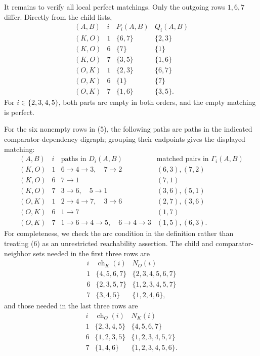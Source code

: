 It remains to verify all local perfect matchings.  Only the outgoing rows \(1,6,7\) differ.  Directly from the child lists,
\[
\begin{array}{c|c|c|c}
(A,B)&i&P_i(A,B)&Q_i(A,B)\\ \hline
(K,O)&1&\{6,7\}&\{2,3\}\\
(K,O)&6&\{7\}&\{1\}\\
(K,O)&7&\{3,5\}&\{1,6\}\\
(O,K)&1&\{2,3\}&\{6,7\}\\
(O,K)&6&\{1\}&\{7\}\\
(O,K)&7&\{1,6\}&\{3,5\}.
\end{array}
\tag{5}
\]
For \(i\in\{2,3,4,5\}\), both parts are empty in both orders, and the empty matching is perfect.

For the six nonempty rows in (5), the following paths are paths in the indicated comparator-dependency digraph; grouping their endpoints gives the displayed matching:
\[
\begin{array}{c|c|c|c}
(A,B)&i&\text{paths in }D_i(A,B)&\text{matched pairs in }\Gamma_i(A,B)\\ \hline
(K,O)&1&6\to4\to3,\quad 7\to2&(6,3),(7,2)\\
(K,O)&6&7\to1&(7,1)\\
(K,O)&7&3\to6,\quad 5\to1&(3,6),(5,1)\\
(O,K)&1&2\to4\to7,\quad 3\to6&(2,7),(3,6)\\
(O,K)&6&1\to7&(1,7)\\
(O,K)&7&1\to6\to4\to5,\quad 6\to4\to3&(1,5),(6,3).
\end{array}
\tag{6}
\]
For completeness, we check the arc condition in the definition rather than treating (6) as an unrestricted reachability assertion.  The child and comparator-neighbor sets needed in the first three rows are
\[
\begin{array}{c|c|c}
i&\operatorname{ch}_K(i)&N_O(i)\\ \hline
1&\{4,5,6,7\}&\{2,3,4,5,6,7\}\\
6&\{2,3,5,7\}&\{1,2,3,4,5,7\}\\
7&\{3,4,5\}&\{1,2,4,6\},
\end{array}
\tag{7}
\]
and those needed in the last three rows are
\[
\begin{array}{c|c|c}
i&\operatorname{ch}_O(i)&N_K(i)\\ \hline
1&\{2,3,4,5\}&\{4,5,6,7\}\\
6&\{1,2,3,5\}&\{1,2,3,4,5,7\}\\
7&\{1,4,6\}&\{1,2,3,4,5,6\}.
\end{array}
\tag{8}
\]
